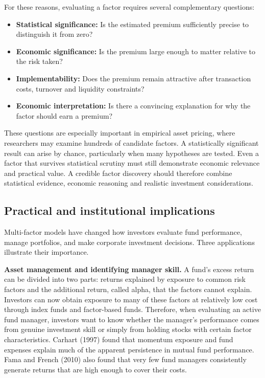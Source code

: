 For these reasons, evaluating a factor requires several complementary questions:

\begin{itemize}
  \item \textbf{Statistical significance:} Is the estimated premium sufficiently precise to distinguish it from zero?
  \item \textbf{Economic significance:} Is the premium large enough to matter relative to the risk taken?
  \item \textbf{Implementability:} Does the premium remain attractive after transaction costs, turnover and liquidity constraints?
  \item \textbf{Economic interpretation:} Is there a convincing explanation for why the factor should earn a premium?
\end{itemize}

These questions are especially important in empirical asset pricing, where researchers may examine hundreds of candidate factors. A statistically significant result can arise by chance, particularly when many hypotheses are tested. Even a factor that survives statistical scrutiny must still demonstrate economic relevance and practical value. A credible factor discovery should therefore combine statistical evidence, economic reasoning and realistic investment considerations.



\subsection{Practical and institutional implications}
\label{sec:03-implications}

Multi-factor models have changed how investors evaluate fund
performance, manage portfolios, and make corporate investment
decisions. Three applications illustrate their importance.

\textbf{Asset management and identifying manager skill.}
A fund's excess return can be divided into two parts: returns
explained by exposure to common risk factors and the additional
return, called alpha, that the factors cannot explain. Investors
can now obtain exposure to many of these factors at relatively
low cost through index funds and factor-based funds. Therefore,
when evaluating an active fund manager, investors want to know
whether the manager's performance comes from genuine investment
skill or simply from holding stocks with certain factor
characteristics. Carhart (1997) found that momentum exposure and
fund expenses explain much of the apparent persistence in mutual
fund performance. Fama and French (2010) also found that very few
fund managers consistently generate returns that are high enough
to cover their costs.

